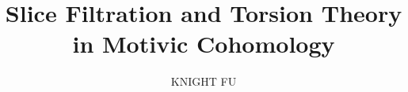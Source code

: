 \documentclass{ruthesis}
\numberwithin{equation}{section}
\theoremstyle{plain} %
\theoremstyle{definition}
\begin{document}
 
\phd 
\title{Slice Filtration and Torsion Theory in Motivic Cohomology}
\author{KNIGHT FU}


\beforepreface 


\dedication{To my high school math teacher, John Reutershan.}

\afterpreface 










% 








\end{document}
